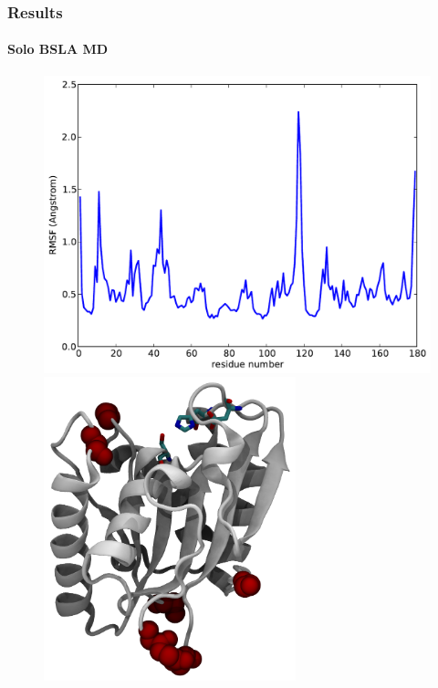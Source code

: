 \documentclass[english]{beamer}
\begin{document}
\begin{frame}
    \frametitle{Results}
    \framesubtitle{Solo BSLA MD} 

    \vspace{0.10\topmargin}

    \begin{figure}
        \begin{minipage}[t]{0.45\linewidth}
            \centering
            \includegraphics[width=1.0\textwidth]{figures/BSLA_solo/BSLA_solo_rmsf.pdf}  
            \linebreak
            \includegraphics[width=0.65\textwidth]{figures/BSLA_flexibility.png}
        \end{minipage}

\end{figure}
\end{frame}
\end{document}
